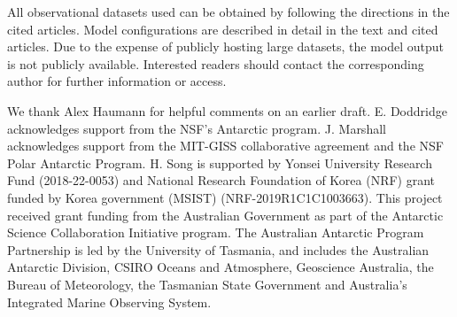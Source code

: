 \documentclass{ametsocV5}
\begin{document}


%
\datastatement
All observational datasets used can be obtained by following the directions in the cited articles. Model configurations are described in detail in the text and cited articles. Due to the expense of publicly hosting large datasets, the model output is not publicly available. Interested readers should contact the corresponding author for further information or access.

%
\acknowledgments
We thank Alex Haumann for helpful comments on an earlier draft. E. Doddridge acknowledges support from the NSF's Antarctic program. J. Marshall acknowledges support from the MIT-GISS collaborative agreement and the NSF Polar Antarctic Program. H. Song is supported by Yonsei University Research Fund (2018-22-0053) and National Research Foundation of Korea (NRF) grant funded by Korea government (MSIST) (NRF-2019R1C1C1003663). This project received grant funding from the Australian Government as part of the Antarctic Science Collaboration Initiative program. The Australian Antarctic Program Partnership is led by the University of Tasmania, and includes the Australian Antarctic Division, CSIRO Oceans and Atmosphere, Geoscience Australia, the Bureau of Meteorology, the Tasmanian State Government and Australia’s Integrated Marine Observing System.


%
\end{document}
